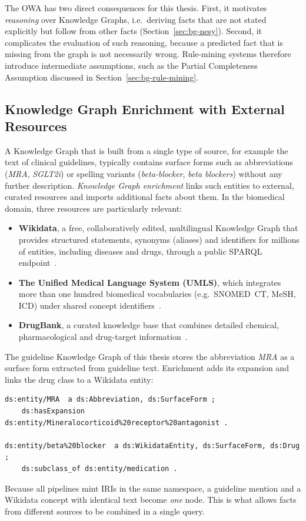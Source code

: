The OWA has two direct consequences for this thesis. First, it motivates
\emph{reasoning} over Knowledge Graphs, i.e.\ deriving facts that are not
stated explicitly but follow from other facts (Section~\ref{sec:bg-nesy}).
Second, it complicates the evaluation of such reasoning, because a predicted
fact that is missing from the graph is not necessarily wrong. Rule-mining
systems therefore introduce intermediate assumptions, such as the
Partial Completeness Assumption discussed in
Section~\ref{sec:bg-rule-mining}.

\subsection{Knowledge Graph Enrichment with External Resources}
\label{sec:bg-enrichment}

A Knowledge Graph that is built from a single type of source, for example the
text of clinical guidelines, typically contains surface forms such as
abbreviations (\emph{MRA}, \emph{SGLT2i}) or spelling variants
(\emph{beta-blocker}, \emph{beta blockers}) without any further description.
\emph{Knowledge Graph enrichment} links such entities to external,
curated resources and imports additional facts about them. In the
biomedical domain, three resources are particularly relevant:

\begin{itemize}
  \item \textbf{Wikidata}, a free, collaboratively edited, multilingual
        Knowledge Graph that provides structured statements, synonyms
        (aliases) and identifiers for millions of entities, including
        diseases and drugs, through a public SPARQL endpoint~\cite{vrandecic2014wikidata}.
  \item \textbf{The Unified Medical Language System (UMLS)}, which integrates
        more than one hundred biomedical vocabularies (e.g.\ SNOMED~CT,
        MeSH, ICD) under shared concept identifiers~\cite{bodenreider2004umls}.
  \item \textbf{DrugBank}, a curated knowledge base that combines detailed
        chemical, pharmacological and drug-target information~\cite{wishart2018drugbank}.
\end{itemize}

\begin{bgexample}
The guideline Knowledge Graph of this thesis stores the abbreviation
\emph{MRA} as a surface form extracted from guideline text. Enrichment adds
its expansion and links the drug class to a Wikidata entity:
\begin{lstlisting}[style=bgcode]
ds:entity/MRA  a ds:Abbreviation, ds:SurfaceForm ;
    ds:hasExpansion ds:entity/Mineralocorticoid%20receptor%20antagonist .

ds:entity/beta%20blocker  a ds:WikidataEntity, ds:SurfaceForm, ds:Drug ;
    ds:subclass_of ds:entity/medication .
\end{lstlisting}
Because all pipelines mint IRIs in the same namespace, a guideline mention
and a Wikidata concept with identical text become \emph{one} node. This is
what allows facts from different sources to be combined in a single query.
\end{bgexample}

